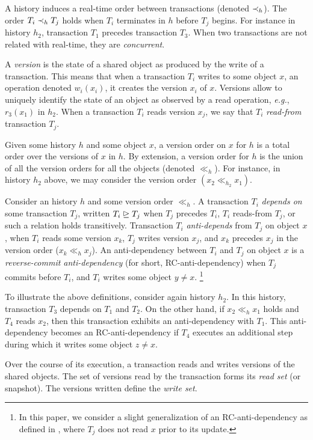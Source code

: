 

A history induces a real-time order between transactions (denoted $\hb_h$).
The order $T_i \hb_h T_j$ holds when $T_i$ terminates in $h$ before $T_j$ begins.
For instance in history $h_2$, transaction $T_1$ precedes transaction $T_3$.
When two transactions are not related with real-time, they are \emph{concurrent}.

A \emph{version} is the state of a shared object as produced by the write of a transaction.
This means that when a transaction $T_i$ writes to some object $x$, an operation denoted $w_i(x_i)$, it creates the version $x_i$ of $x$.
Versions allow to uniquely identify the state of an object as observed by a read operation, \emph{e.g.}, $r_3(x_1)$ in $h_2$.
When a transaction $T_i$ reads version $x_j$, we say that $T_i$ \emph{read-from} transaction $T_j$.

Given some history $h$ and some object $x$, a version order on $x$ for $h$ is a total order over the versions of $x$ in $h$.
By extension, a version order for $h$ is the union of all the version orders for all the objects (denoted $\ll_h$).
For instance, in history $h_2$ above, we may consider the version order $(x_2 \ll_{h_2} x_1)$.

Consider an history $h$ and some version order $\ll_h$.
A transaction $T_i$ \emph{depends on} some transaction $T_j$, written $T_i \mathrel{\unrhd} T_j$ when $T_j$ precedes $T_i$, $T_i$ reads-from $T_j$, or such a relation holds transitively.
Transaction $T_i$ \emph{anti-depends} from $T_j$ on object $x$, when $T_i$ reads some version $x_k$, $T_j$ writes version $x_j$, and $x_k$ precedes $x_j$ in the version order ($x_k \ll_{h} x_j$).
An anti-dependency between $T_i$ and $T_j$ on object $x$ is a \emph{reverse-commit anti-dependency} (for short, RC-anti-dependency) \cite{hans16} when $T_j$ commits before $T_i$, and $T_i$ writes some object $y \neq x$.%
%
\footnote{
  In this paper, we consider a slight generalization of an RC-anti-dependency as defined in \cite{hans16}, where $T_j$ does not read $x$ prior to its update.
}

To illustrate the above definitions, consider again history $h_2$.
In this history, transaction $T_3$ depends on $T_1$ and $T_2$.
On the other hand, if $x_2 \ll_h x_1$ holds and $T_4$ reads $x_2$, then this transaction exhibits an anti-dependency with $T_1$.
This anti-dependency becomes an RC-anti-dependency if $T_4$ executes an additional step during which it writes some object $z \neq x$.

Over the course of its execution, a transaction reads and writes versions of the shared objects.
The set of versions read by the transaction forms its \emph{read set} (or snapshot).
The versions written define the \emph{write set}.

